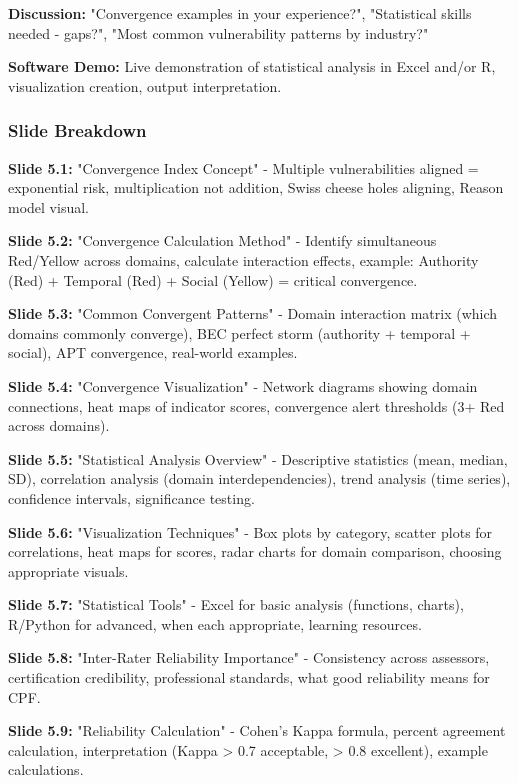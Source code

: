 \documentclass[11pt,a4paper]{article}
\begin{document}
\textbf{Discussion:} "Convergence examples in your experience?", "Statistical skills needed - gaps?", "Most common vulnerability patterns by industry?"

\textbf{Software Demo:} Live demonstration of statistical analysis in Excel and/or R, visualization creation, output interpretation.

\subsubsection{Slide Breakdown}

\textbf{Slide 5.1:} "Convergence Index Concept" - Multiple vulnerabilities aligned = exponential risk, multiplication not addition, Swiss cheese holes aligning, Reason model visual.

\textbf{Slide 5.2:} "Convergence Calculation Method" - Identify simultaneous Red/Yellow across domains, calculate interaction effects, example: Authority (Red) + Temporal (Red) + Social (Yellow) = critical convergence.

\textbf{Slide 5.3:} "Common Convergent Patterns" - Domain interaction matrix (which domains commonly converge), BEC perfect storm (authority + temporal + social), APT convergence, real-world examples.

\textbf{Slide 5.4:} "Convergence Visualization" - Network diagrams showing domain connections, heat maps of indicator scores, convergence alert thresholds (3+ Red across domains).

\textbf{Slide 5.5:} "Statistical Analysis Overview" - Descriptive statistics (mean, median, SD), correlation analysis (domain interdependencies), trend analysis (time series), confidence intervals, significance testing.

\textbf{Slide 5.6:} "Visualization Techniques" - Box plots by category, scatter plots for correlations, heat maps for scores, radar charts for domain comparison, choosing appropriate visuals.

\textbf{Slide 5.7:} "Statistical Tools" - Excel for basic analysis (functions, charts), R/Python for advanced, when each appropriate, learning resources.

\textbf{Slide 5.8:} "Inter-Rater Reliability Importance" - Consistency across assessors, certification credibility, professional standards, what good reliability means for CPF.

\textbf{Slide 5.9:} "Reliability Calculation" - Cohen's Kappa formula, percent agreement calculation, interpretation (Kappa > 0.7 acceptable, > 0.8 excellent), example calculations.
\end{document}
